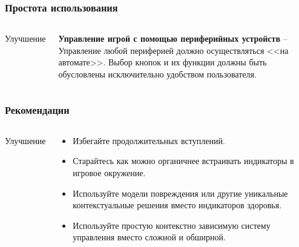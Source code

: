 \documentclass[10pt]{beamer}
\begin{document}
\begin{frame}
\frametitle{Простота использования}

\begin{columns}[c]

\begin{center}
  Улучшение
\end{center}

\begin{block}{}

  \textbf{Управление игрой с помощью периферийных устройств} -- Управление любой периферией должно осуществляться <<на автомате>>. Выбор кнопок и их функции должны быть обусловлены исключительно удобством пользователя.

\end{block}
\end{columns}
\end{frame}

\begin{frame}
\frametitle{Рекомендации}

\begin{columns}[c]

\begin{center}
  Улучшение
\end{center}

\begin{block}{}

\begin{itemize}
  \item Избегайте продолжительных вступлений.
  \item Старайтесь как можно органичнее встраивать индикаторы в игровое окружение.
  \item Используйте модели повреждения или другие уникальные контекстуальные решения вместо индикаторов здоровья.
  \item Используйте простую контекстно зависимую систему управления вместо сложной и обширной.
\end{itemize}

\end{block}
\end{columns}
\end{frame}
\end{document}
